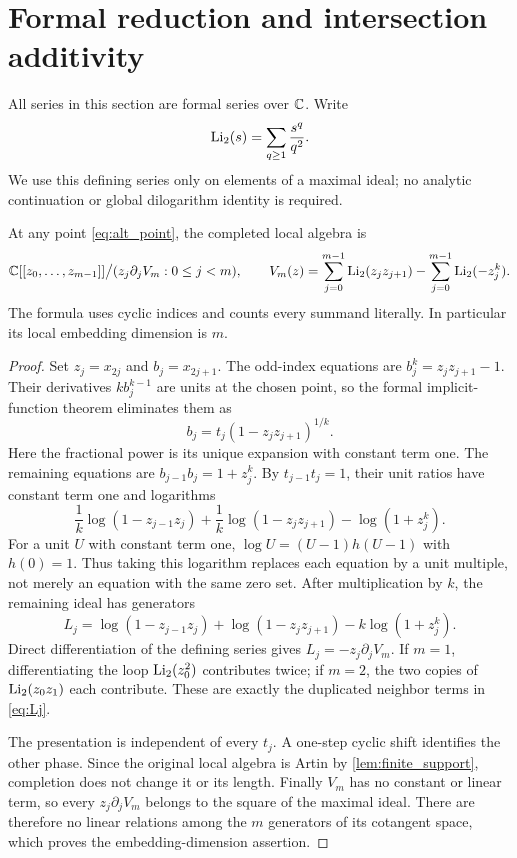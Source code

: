 \section{Formal reduction and intersection additivity}\label{sec:formal}

All series in this section are formal series over $\mathbb C$. Write
\[
 \operatorname{Li}_2(s)=\sum_{q\geq1}\frac{s^q}{q^2}.
\]
We use this defining series only on elements of a maximal ideal; no
analytic continuation or global dilogarithm identity is required.

\begin{proposition}\label{prop:potential}
At any point \eqref{eq:alt_point}, the completed local algebra is
\begin{equation}\label{eq:localmodel}
 \mathbb C[[z_0,\ldots,z_{m-1}]]
 \big/(z_j\partial_j V_m:0\leq j<m),
 \qquad
 V_m(z)=\sum_{j=0}^{m-1}\operatorname{Li}_2(z_jz_{j+1})
       -\sum_{j=0}^{m-1}\operatorname{Li}_2(-z_j^k).
\end{equation}
The formula uses cyclic indices and counts every summand literally.
In particular its local embedding dimension is $m$.
\end{proposition}

\begin{proof}
Set $z_j=x_{2j}$ and $b_j=x_{2j+1}$. The odd-index equations are
$b_j^k=z_jz_{j+1}-1$. Their derivatives $kb_j^{k-1}$ are units at the
chosen point, so the formal implicit-function theorem eliminates them as
\begin{equation}\label{eq:bsolve}
 b_j=t_j(1-z_jz_{j+1})^{1/k}.
\end{equation}
Here the fractional power is its unique expansion with constant term one.
The remaining equations are $b_{j-1}b_j=1+z_j^k$. By
$t_{j-1}t_j=1$, their unit ratios have constant term one and logarithms
\[
 \frac1k\log(1-z_{j-1}z_j)
 +\frac1k\log(1-z_jz_{j+1})-\log(1+z_j^k).
\]
For a unit $U$ with constant term one, $\log U=(U-1)h(U-1)$ with
$h(0)=1$. Thus taking this logarithm replaces each equation by a unit
multiple, not merely an equation with the same zero set. After multiplication
by $k$, the remaining ideal has generators
\begin{equation}\label{eq:Lj}
 L_j=\log(1-z_{j-1}z_j)+\log(1-z_jz_{j+1})
       -k\log(1+z_j^k).
\end{equation}
Direct differentiation of the defining series gives
$L_j=-z_j\partial_j V_m$. If $m=1$, differentiating the loop
$\operatorname{Li}_2(z_0^2)$ contributes twice; if $m=2$, the two copies of
$\operatorname{Li}_2(z_0z_1)$ each contribute. These are exactly the duplicated neighbor
terms in \eqref{eq:Lj}.

The presentation is independent of every $t_j$. A one-step cyclic shift
identifies the other phase. Since the original local algebra is Artin by
\cref{lem:finite_support}, completion does not change it or its length.
Finally $V_m$ has no constant or linear term, so every
$z_j\partial_jV_m$ belongs to the square of the maximal ideal. There are
therefore no linear relations among the $m$ generators of its cotangent
space, which proves the embedding-dimension assertion.
\end{proof}


